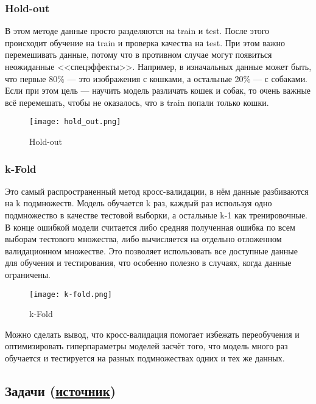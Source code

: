 \subsubsection{Hold-out}

В этом методе данные просто разделяются на train и test. После этого происходит обучение на train и проверка качества на test. При этом важно перемешивать данные, потому что в противном случае могут появиться неожиданные <<спецэффекты>>. Например, в изначальных данные может быть, что первые 80\% --- это изображения с кошками, а остальные 20\% --- с собаками. Если при этом цель --- научить модель различать кошек и собак, то очень важные всё перемешать, чтобы не оказалось, что в train попали только кошки.

\begin{figure}[h]
	\centering
	\texttt{[image: hold\_out.png]}
	\caption{Hold-out}
	\label{img:hold-out}
\end{figure}

\subsubsection{k-Fold}

Это самый распространенный метод кросс-валидации, в нём данные разбиваются на k подмножеств. Модель обучается k раз, каждый раз используя одно подмножество в качестве тестовой выборки, а остальные k-1 как тренировочные. В конце ошибкой модели считается либо средняя полученная ошибка по всем выборам тестового множества, либо вычисляется на отдельно отложенном валидационном множестве. Это позволяет использовать все доступные данные для обучения и тестирования, что особенно полезно в случаях, когда данные ограничены.

\begin{figure}[h]
	\centering
	\texttt{[image: k-fold.png]}
	\caption{k-Fold}
	\label{img:k-fold}
\end{figure}

Можно сделать вывод, что кросс-валидация помогает избежать переобучения и оптимизировать гиперпараметры моделей засчёт того, что модель много раз обучается и тестируется на разных подмножествах одних и тех же данных.

\subsection{Задачи (\href{https://education.yandex.ru/handbook/ml/article/kross-validaciya}{источник})}

